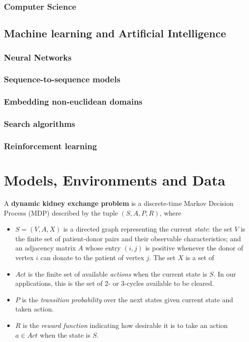 \documentclass[12pt]{article}
\begin{document}
 \citet{unver2010dynamic}



\subsubsection{Computer Science}

\subsection{Machine learning and Artificial Intelligence}
\subsubsection{Neural Networks}
\subsubsection{Sequence-to-sequence models}
\subsubsection{Embedding non-euclidean domains}
\subsubsection{Search algorithms}
\subsubsection{Reinforcement learning}


\section{Models, Environments and Data} \label{sec:data}

A \textbf{dynamic kidney exchange problem} is a discrete-time Markov Decision Process (MDP) described by the tuple $(S, A, P, R)$, where

\begin{itemize}
  \item $S = (V, A, X)$ is a directed graph representing the current \emph{state}: the set $V$ is the finite set of patient-donor pairs and their observable characteristics; and an adjacency matrix $A$ whose entry $(i,j)$ is positive whenever the donor of vertex $i$ can donate to the patient of vertex $j$. The set $X$ is a set of 
  \item $Act$ is the finite set of available \emph{actions} when the current state is $S$. In our applications, this is the set of 2- or 3-cycles available to be cleared.
  \item $P$ is the \emph{transition probability} over the next states given current state and taken action.
  \item $R$ is the \emph{reward function} indicating how desirable it is to take an action $a \in Act$ when the state is $S$.
\end{itemize}
\end{document}
